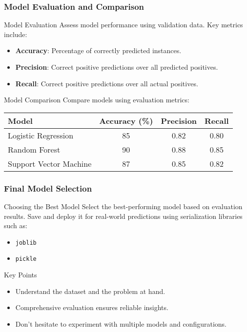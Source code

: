 \documentclass[aspectratio=169]{beamer}
\begin{document}
\begin{frame}
    \frametitle{Model Evaluation and Comparison}
    \begin{block}{Model Evaluation}
        Assess model performance using validation data. Key metrics include:
        \begin{itemize}
            \item \textbf{Accuracy}: Percentage of correctly predicted instances.
            \item \textbf{Precision}: Correct positive predictions over all predicted positives.
            \item \textbf{Recall}: Correct positive predictions over all actual positives.
        \end{itemize}
    \end{block}
    
    \begin{block}{Model Comparison}
        Compare models using evaluation metrics:
        \begin{center}
        \begin{tabular}{|l|c|c|c|}
            \hline
            Model & Accuracy (\%) & Precision & Recall \\
            \hline
            Logistic Regression & 85 & 0.82 & 0.80 \\
            Random Forest & 90 & 0.88 & 0.85 \\
            Support Vector Machine & 87 & 0.85 & 0.82 \\
            \hline
        \end{tabular}
        \end{center}
    \end{block}
\end{frame}

\begin{frame}
    \frametitle{Final Model Selection}
    \begin{block}{Choosing the Best Model}
        Select the best-performing model based on evaluation results. Save and deploy it for real-world predictions using serialization libraries such as:
        \begin{itemize}
            \item \texttt{joblib}
            \item \texttt{pickle}
        \end{itemize}
    \end{block}

    \begin{block}{Key Points}
        \begin{itemize}
            \item Understand the dataset and the problem at hand.
            \item Comprehensive evaluation ensures reliable insights.
            \item Don't hesitate to experiment with multiple models and configurations.
        \end{itemize}
    \end{block}
\end{frame}
\end{document}
